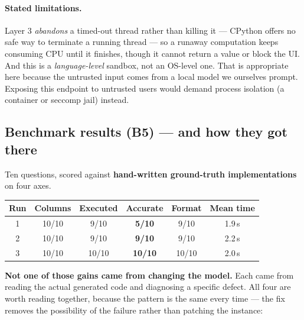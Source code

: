 \documentclass[11pt,a4paper]{article}
\begin{document}
\paragraph{Stated limitations.} Layer 3 \emph{abandons} a timed-out thread rather than
killing it --- CPython offers no safe way to terminate a running thread --- so a
runaway computation keeps consuming CPU until it finishes, though it cannot return a
value or block the UI. And this is a \emph{language-level} sandbox, not an OS-level
one. That is appropriate here because the untrusted input comes from a local model we
ourselves prompt. Exposing this endpoint to untrusted users would demand process
isolation (a container or seccomp jail) instead.

\subsection{Benchmark results (B5) --- and how they got there}
\label{sec:bench}

Ten questions, scored against \textbf{hand-written ground-truth implementations} on
four axes.

\begin{center}
\begin{tabular}{@{}cccccc@{}}
\toprule
\textbf{Run} & \textbf{Columns} & \textbf{Executed} & \textbf{Accurate} & \textbf{Format} & \textbf{Mean time} \\
\midrule
1 & 10/10 & 9/10  & \textbf{5/10}  & 9/10  & 1.9\,s \\
2 & 10/10 & 9/10  & \textbf{9/10}  & 9/10  & 2.2\,s \\
3 & 10/10 & 10/10 & \textbf{10/10} & 10/10 & 2.0\,s \\
\bottomrule
\end{tabular}
\end{center}

\textbf{Not one of those gains came from changing the model.} Each came from reading
the actual generated code and diagnosing a specific defect. All four are worth
reading together, because the pattern is the same every time --- the fix removes the
possibility of the failure rather than patching the instance:
\end{document}
